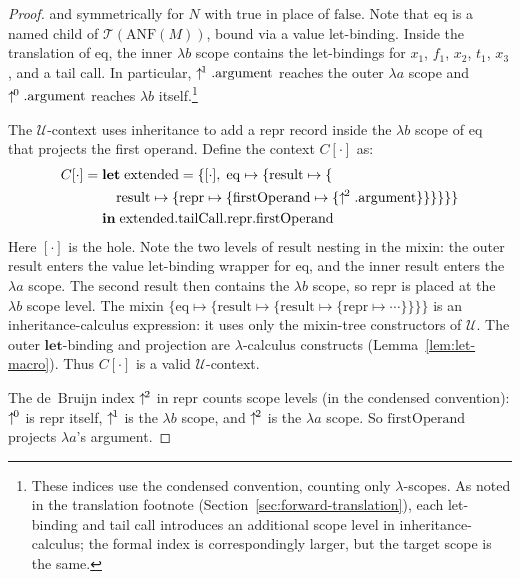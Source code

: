 \begin{proof}
  and symmetrically for $N$ with $\mathrm{true}$ in place
  of $\mathrm{false}$.
  Note that $\mathrm{eq}$ is a named child
  of $\mathcal{T}(\mathrm{ANF}(M))$, bound via a value
  let-binding.
  Inside the translation of $\mathrm{eq}$, the inner
  $\lambda b$ scope contains the let-bindings
  for $x_1$, $f_1$, $x_2$, $t_1$, $x_3$, and a tail call.
  In particular, $\uparrow^{\!1}.\mathrm{argument}$ reaches
  the outer $\lambda a$ scope and
  $\uparrow^{\!0}.\mathrm{argument}$ reaches $\lambda b$
  itself.\footnote{
    These indices use the condensed
    convention, counting only $\lambda$-scopes.
    As noted in the translation footnote
    (Section~\ref{sec:forward-translation}),
    each let-binding and tail call introduces an
    additional scope level in inheritance-calculus;
    the formal index is correspondingly larger,
    but the target scope is the same.
  }

  The $\mathscr{U}$-context uses inheritance to add
  a $\mathrm{repr}$ record inside the $\lambda b$ scope
  of $\mathrm{eq}$ that projects the first operand.
  Define the context $C[\cdot]$ as:
  \begin{align*}
    C[\cdot] ={} & \mathbf{let}\;
    \mathrm{extended} = \{[\cdot],\;
      \mathrm{eq} \mapsto \{
        \mathrm{result} \mapsto \{ \\
          &\quad
          \mathrm{result} \mapsto \{
            \mathrm{repr} \mapsto \{
              \mathrm{firstOperand}
              \mapsto \{\uparrow^{\!2}.\mathrm{argument}\}
    \}\}\}\}\} \\
    & \mathbf{in}\;
    \mathrm{extended}.\mathrm{tailCall}.\mathrm{repr}.\mathrm{firstOperand}
  \end{align*}
  Here $[\cdot]$ is the hole.
  Note the two levels of $\mathrm{result}$ nesting in the
  mixin: the outer $\mathrm{result}$ enters the value
  let-binding wrapper for $\mathrm{eq}$, and the inner
  $\mathrm{result}$ enters the $\lambda a$ scope.
  The second $\mathrm{result}$ then contains the
  $\lambda b$ scope, so $\mathrm{repr}$ is placed at
  the $\lambda b$ scope level.
  The mixin $\{\mathrm{eq} \mapsto \{\mathrm{result}
      \mapsto \{\mathrm{result} \mapsto
  \{\mathrm{repr} \mapsto \cdots\}\}\}\}$ is an
  inheritance-calculus expression: it uses only the
  mixin-tree constructors of $\mathscr{U}$.
  The outer $\mathbf{let}$-binding and projection are
  $\lambda$-calculus constructs (Lemma~\ref{lem:let-macro}).
  Thus $C[\cdot]$ is a valid $\mathscr{U}$-context.

  The de~Bruijn index $\uparrow^{\!2}$ in
  $\mathrm{repr}$ counts scope levels
  (in the condensed convention):
  $\uparrow^{\!0}$ is $\mathrm{repr}$ itself,
  $\uparrow^{\!1}$ is the $\lambda b$ scope, and
  $\uparrow^{\!2}$ is the $\lambda a$ scope.
  So $\mathrm{firstOperand}$ projects
  $\lambda a$'s argument.


\end{proof}
